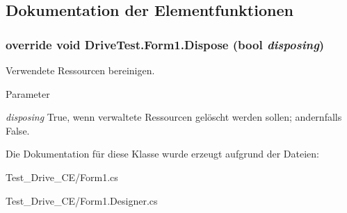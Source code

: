 \subsection{Dokumentation der Elementfunktionen}
\hypertarget{class_drive_test_1_1_form1_a214a0a440a31be16cf29a0d717bfa824}{
\subsubsection[{Dispose}]{\setlength{\rightskip}{0pt plus 5cm}override void DriveTest.Form1.Dispose (bool {\em disposing})}}
\label{class_drive_test_1_1_form1_a214a0a440a31be16cf29a0d717bfa824}


Verwendete Ressourcen bereinigen. 


\begin{DoxyParams}{Parameter}
\item[{\em disposing}]True, wenn verwaltete Ressourcen gelöscht werden sollen; andernfalls False.\end{DoxyParams}


Die Dokumentation für diese Klasse wurde erzeugt aufgrund der Dateien:\begin{DoxyCompactItemize}
\item 
Test\_\-Drive\_\-CE/Form1.cs\item 
Test\_\-Drive\_\-CE/Form1.Designer.cs\end{DoxyCompactItemize}
